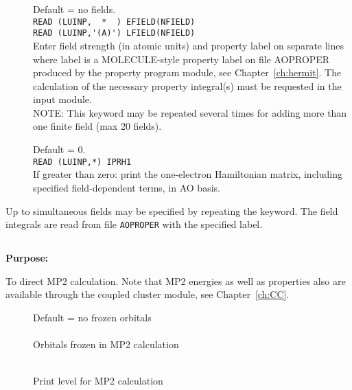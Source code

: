 \begin{description}
\item[]
  Default = no fields. \\
  \verb"READ (LUINP,  *  ) EFIELD(NFIELD)" \\
  \verb"READ (LUINP,'(A)') LFIELD(NFIELD)" \\
  Enter field strength (in atomic units) and property label on separate lines
  where label is a MOLE\-CULE-style property label on file AOPROPER
  produced by the property program module, see Chapter~\ref{ch:hermit}.
  The calculation of the necessary property integral(s) must be requested
  in the  input module. \\
  NOTE: This keyword may be repeated several times for adding more than
  one finite field (max 20 fields).

\item[]
  Default = 0.\\
  \verb"READ (LUINP,*) IPRH1" \\
  If greater than zero:
  print the one-electron Hamiltonian matrix, including
  specified field-dependent terms, in AO basis.
\end{description}


Up to \mxfelt simultaneous fields may be specified by repeating the
 keyword.
The field integrals are read from file \verb|AOPROPER| with the specified label.

\pagebreak[3]
\subsection{\label{ref-mp2inp}}

{\bf Purpose:}

To direct MP2 calculation. Note that MP2 energies as well as
properties also are available through the coupled cluster module, see
Chapter~\ref{ch:CC}.

\begin{description}
\item[]
  Default = no frozen orbitals\\
   \\
  Orbitals frozen in MP2 calculation

\item[]
   \\
  Print level for MP2 calculation
\end{description}



